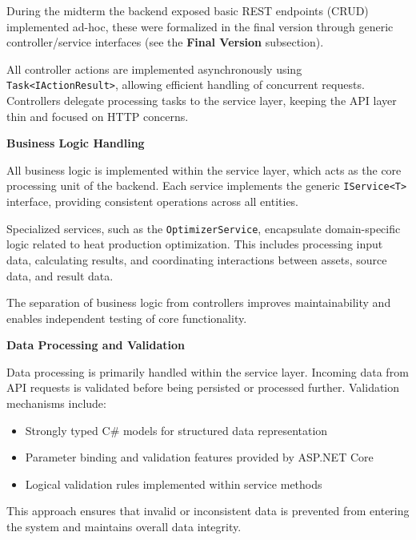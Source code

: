 \hspace*{1cm}During the midterm the backend exposed basic REST endpoints (CRUD) implemented ad-hoc, these were formalized in the final version through generic controller/service interfaces (see the \textbf{Final Version} subsection).

\hspace*{1cm}All controller actions are implemented asynchronously using \texttt{Task<IActionResult>}, allowing efficient handling of concurrent requests. Controllers delegate processing tasks to the service layer, keeping the API layer thin and focused on HTTP concerns.


\textbf{Business Logic Handling}

\hspace*{1cm}All business logic is implemented within the service layer, which acts as the core processing unit of the backend. Each service implements the generic \texttt{IService<T>} interface, providing consistent operations across all entities.

\hspace*{1cm}Specialized services, such as the \texttt{OptimizerService}, encapsulate domain-specific logic related to heat production optimization. This includes processing input data, calculating results, and coordinating interactions between assets, source data, and result data.

\hspace*{1cm}The separation of business logic from controllers improves maintainability and enables independent testing of core functionality.


\textbf{Data Processing and Validation}

\hspace*{1cm}Data processing is primarily handled within the service layer. Incoming data from API requests is validated before being persisted or processed further. Validation mechanisms include:

\begin{itemize}
    \item Strongly typed C\# models for structured data representation
    \item Parameter binding and validation features provided by ASP.NET Core
    \item Logical validation rules implemented within service methods
\end{itemize}

\hspace*{1cm}This approach ensures that invalid or inconsistent data is prevented from entering the system and maintains overall data integrity.


